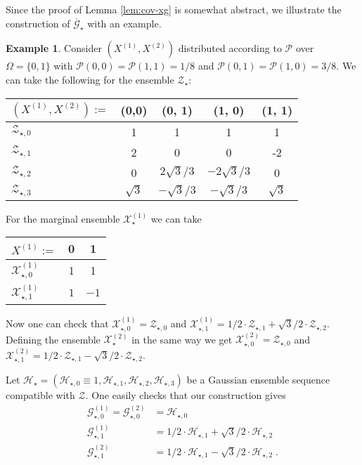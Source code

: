 \documentclass{daj}
\newcommand{\1}{\mathbbm{1}}
\theoremstyle{plain}
\theoremstyle{definition}
\newtheorem{example}[theorem]{Example}
\newcommand{\cP}{\mathcal{P}}
\begin{document}
Since the proof of Lemma \ref{lem:cov-xg} is somewhat abstract, 
we illustrate the construction of $\overline{\mathcal{G}}_\star$ 
with an example.

\begin{example}
Consider $(X^{(1)}, X^{(2)})$ distributed according to $\cP$ 
over $\Omega = \{0,1\}$ with
$\cP(0, 0) = \cP(1, 1) = 1/8$ and $\cP(0, 1) = \cP(1, 0) = 3/8$. We can take
the following for the ensemble $\mathcal{Z}_\star$:

\begin{tabular}{|l||c|c|c|c|}
\hline
$(X^{(1)}, X^{(2)}) :=$ & (0,0) & (0, 1) & (1, 0) & (1, 1) 
\\ \hline \hline
$\mathcal{Z}_{\star, 0}$ & 1 & 1 & 1 & 1
\\ \hline
$\mathcal{Z}_{\star, 1}$ & 2 & 0 & 0 & -2
\\ \hline
$\mathcal{Z}_{\star, 2}$ & 0 & $2\sqrt{3}/3$ & $-2\sqrt{3}/3$ & 0
\\ \hline
$\mathcal{Z}_{\star, 3}$ & $\sqrt{3}$ & $-\sqrt{3}/3$ & $-\sqrt{3}/3$ 
                                                  & $\sqrt{3}$
\\ \hline
\end{tabular}

For the marginal ensemble $\mathcal{X}_\star^{(1)}$ we can take

\begin{tabular}{|l||c|c|}
\hline
$X^{(1)} :=$ & 0 & 1 
\\ \hline \hline
$\mathcal{X}_{\star, 0}^{(1)}$ & 1 & 1
\\ \hline
$\mathcal{X}_{\star, 1}^{(1)}$ & $1$ & $-1$
\\ \hline
\end{tabular}

Now one can check that $\mathcal{X}^{(1)}_{\star, 0} = \mathcal{Z}_{\star, 0}$
and 
$\mathcal{X}^{(1)}_{\star, 1} = 1/2 \cdot \mathcal{Z}_{\star, 1}
+\sqrt{3}/2 \cdot \mathcal{Z}_{\star,2}$. 
Defining the ensemble $\mathcal{X}_{\star}^{(2)}$ in the same way we get
$\mathcal{X}^{(2)}_{\star,0} = \mathcal{Z}_{\star,0}$ and
$\mathcal{X}^{(2)}_{\star,1} = 1/2 \cdot \mathcal{Z}_{\star, 1} -\sqrt{3}/2 \cdot
\mathcal{Z}_{\star, 2}$.

Let $\mathcal{H}_{\star} = 
(\mathcal{H}_{\star, 0}\equiv 1, \mathcal{H}_{\star, 1}, \mathcal{H}_{\star, 2}, 
\mathcal{H}_{\star, 3})$ be a Gaussian ensemble sequence compatible with
$\mathcal{Z}$. One easily checks that our construction gives
\begin{align*}
\mathcal{G}_{\star, 0}^{(1)} = \mathcal{G}_{\star, 0}^{(2)} & =  \mathcal{H}_{\star, 0}
\\
\mathcal{G}^{(1)}_{\star, 1} & = 
1/2 \cdot \mathcal{H}_{\star, 1} +\sqrt{3}/2 \cdot \mathcal{H}_{\star,2}
\\
\mathcal{G}^{(2)}_{\star,1} & = 
1/2 \cdot \mathcal{H}_{\star, 1} -\sqrt{3}/2 \cdot \mathcal{H}_{\star, 2} \; .
\end{align*}
\end{example}
\end{document}
